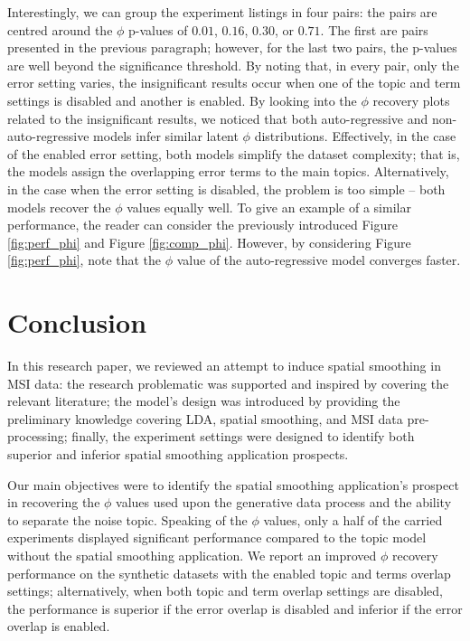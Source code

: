 \documentclass{mpaper}
\begin{document}
\par Interestingly, we can group the experiment listings in four pairs: the pairs are centred around the $\phi$ p-values of $0.01$, $0.16$, $0.30$, or $0.71$. The first are pairs presented in the previous paragraph; however, for the last two pairs, the p-values are well beyond the significance threshold. By noting that, in every pair, only the error setting varies, the insignificant results occur when one of the topic and term settings is disabled and another is enabled. By looking into the $\phi$ recovery plots related to the insignificant results, we noticed that both auto-regressive and non-auto-regressive models infer similar latent $\phi$ distributions. Effectively, in the case of the enabled error setting, both models simplify the dataset complexity; that is, the models assign the overlapping error terms to the main topics. Alternatively, in the case when the error setting is disabled, the problem is too simple -- both models recover the $\phi$ values equally well. To give an example of a similar performance, the reader can consider the previously introduced Figure \ref{fig:perf_phi} and Figure \ref{fig:comp_phi}. However, by considering Figure \ref{fig:perf_phi}, note that the $\phi$ value of the auto-regressive model converges faster.

\section{Conclusion}

\par In this research paper, we reviewed an attempt to induce spatial smoothing in MSI data: the research problematic was supported and inspired by covering the relevant literature; the model's design was introduced by providing the preliminary knowledge covering LDA, spatial smoothing, and MSI data pre-processing; finally, the experiment settings were designed to identify both superior and inferior spatial smoothing application prospects.

\par Our main objectives were to identify the spatial smoothing application's prospect in recovering the $\phi$ values used upon the generative data process and the ability to separate the noise topic. Speaking of the $\phi$ values, only a half of the carried experiments displayed significant performance compared to the topic model without the spatial smoothing application. We report an improved $\phi$ recovery performance on the synthetic datasets with the enabled topic and terms overlap settings; alternatively, when both topic and term overlap settings are disabled, the performance is superior if the error overlap is disabled and inferior if the error overlap is enabled.
\end{document}
